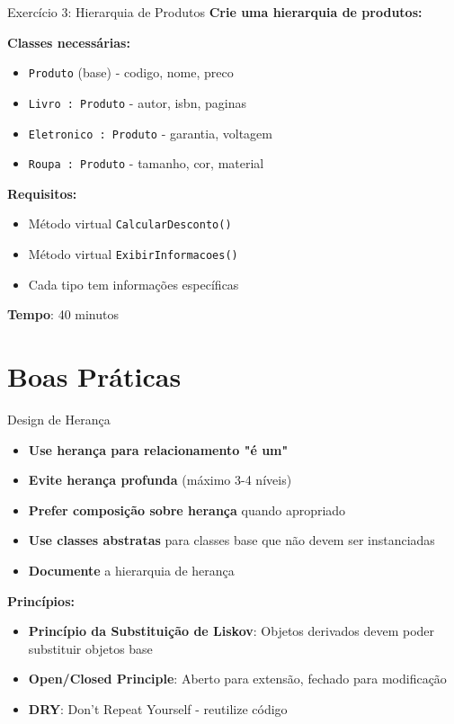 \documentclass[aspectratio=169]{beamer}
\begin{document}
\begin{frame}{Exercício 3: Hierarquia de Produtos}
\textbf{Crie uma hierarquia de produtos:}

\textbf{Classes necessárias:}
\begin{itemize}
\item \texttt{Produto} (base) - codigo, nome, preco
\item \texttt{Livro : Produto} - autor, isbn, paginas
\item \texttt{Eletronico : Produto} - garantia, voltagem
\item \texttt{Roupa : Produto} - tamanho, cor, material
\end{itemize}

\textbf{Requisitos:}
\begin{itemize}
\item Método virtual \texttt{CalcularDesconto()}
\item Método virtual \texttt{ExibirInformacoes()}
\item Cada tipo tem informações específicas
\end{itemize}

\vspace{0.3cm}
\textbf{Tempo}: 40 minutos
\end{frame}

\section{Boas Práticas}

\begin{frame}{Design de Herança}
\begin{itemize}
\item \textbf{Use herança para relacionamento "é um"}
\item \textbf{Evite herança profunda} (máximo 3-4 níveis)
\item \textbf{Prefer composição sobre herança} quando apropriado
\item \textbf{Use classes abstratas} para classes base que não devem ser instanciadas
\item \textbf{Documente} a hierarquia de herança
\end{itemize}

\vspace{0.5cm}
\textbf{Princípios:}
\begin{itemize}
\item \textbf{Princípio da Substituição de Liskov}: Objetos derivados devem poder substituir objetos base
\item \textbf{Open/Closed Principle}: Aberto para extensão, fechado para modificação
\item \textbf{DRY}: Don't Repeat Yourself - reutilize código
\end{itemize}
\end{frame}
\end{document}
